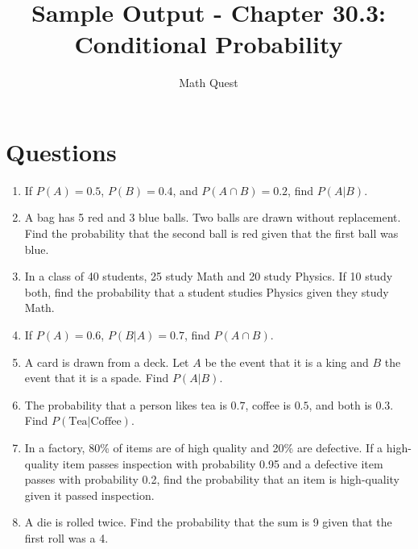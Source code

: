 \documentclass[12pt]{article}
\title{Sample Output - Chapter 30.3: Conditional Probability}
\author{Math Quest}
\date{}
\begin{document}
\maketitle

\section*{Questions}

\begin{enumerate}
    \item If $P(A) = 0.5$, $P(B) = 0.4$, and $P(A \cap B) = 0.2$, find $P(A|B)$.
    \item A bag has 5 red and 3 blue balls. Two balls are drawn without replacement. Find the probability that the second ball is red given that the first ball was blue.
    \item In a class of 40 students, 25 study Math and 20 study Physics. If 10 study both, find the probability that a student studies Physics given they study Math.
    \item If $P(A) = 0.6$, $P(B|A) = 0.7$, find $P(A \cap B)$.
    \item A card is drawn from a deck. Let $A$ be the event that it is a king and $B$ the event that it is a spade. Find $P(A|B)$.
    \item The probability that a person likes tea is $0.7$, coffee is $0.5$, and both is $0.3$. Find $P(\text{Tea}|\text{Coffee})$.
    \item In a factory, 80\% of items are of high quality and 20\% are defective. If a high-quality item passes inspection with probability 0.95 and a defective item passes with probability 0.2, find the probability that an item is high-quality given it passed inspection.
    \item A die is rolled twice. Find the probability that the sum is 9 given that the first roll was a 4.
\end{enumerate}
\end{document}
